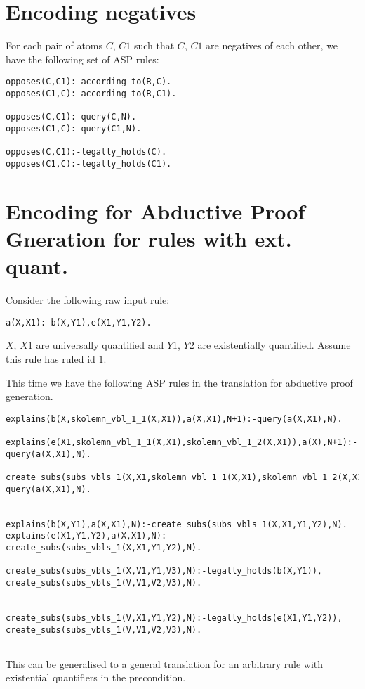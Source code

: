 \documentclass{article}
\begin{document}
\section{Encoding negatives}
For each pair of atoms $C$, $C1$ such that $C$, $C1$ are negatives of each other, we have the following set of ASP rules:
\begin{verbatim}
opposes(C,C1):-according_to(R,C).
opposes(C1,C):-according_to(R,C1).

opposes(C,C1):-query(C,N).
opposes(C1,C):-query(C1,N).

opposes(C,C1):-legally_holds(C).
opposes(C1,C):-legally_holds(C1).
\end{verbatim}

\section{Encoding for Abductive Proof Gneration for rules with ext. quant.}

Consider the following raw input rule:
\begin{verbatim}
a(X,X1):-b(X,Y1),e(X1,Y1,Y2).
\end{verbatim}

$X$, $X1$ are universally quantified and $Y1$, $Y2$ are existentially quantified. Assume this rule has ruled id $1$.

This time we have the following ASP rules in the translation for abductive proof generation.

\begin{verbatim}
explains(b(X,skolemn_vbl_1_1(X,X1)),a(X,X1),N+1):-query(a(X,X1),N).

explains(e(X1,skolemn_vbl_1_1(X,X1),skolemn_vbl_1_2(X,X1)),a(X),N+1):-query(a(X,X1),N).

create_subs(subs_vbls_1(X,X1,skolemn_vbl_1_1(X,X1),skolemn_vbl_1_2(X,X1)),N+1):-query(a(X,X1),N).


explains(b(X,Y1),a(X,X1),N):-create_subs(subs_vbls_1(X,X1,Y1,Y2),N).
explains(e(X1,Y1,Y2),a(X,X1),N):-create_subs(subs_vbls_1(X,X1,Y1,Y2),N).

create_subs(subs_vbls_1(X,V1,Y1,V3),N):-legally_holds(b(X,Y1)),
create_subs(subs_vbls_1(V,V1,V2,V3),N).


create_subs(subs_vbls_1(V,X1,Y1,Y2),N):-legally_holds(e(X1,Y1,Y2)),
create_subs(subs_vbls_1(V,V1,V2,V3),N).
    
\end{verbatim}

This can be generalised to a general translation for an arbitrary rule with existential quantifiers in the precondition.
\end{document}
